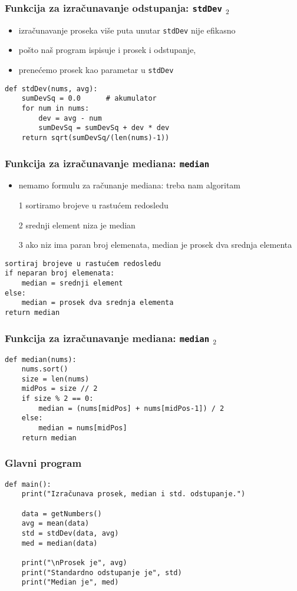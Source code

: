 \documentclass[utf8,compress]{beamer}
\begin{document}
\begin{frame}[fragile]
  \frametitle{Funkcija za izračunavanje odstupanja: \texttt{stdDev} $_2$}
  \begin{itemize}
    \item izračunavanje proseka više puta unutar \texttt{stdDev} nije efikasno
    \item pošto naš program ispisuje i prosek i odstupanje, 
    \item prenećemo prosek kao parametar u \texttt{stdDev}
  \end{itemize}
\begin{verbatim}
def stdDev(nums, avg):
    sumDevSq = 0.0      # akumulator
    for num in nums:
        dev = avg - num
        sumDevSq = sumDevSq + dev * dev
    return sqrt(sumDevSq/(len(nums)-1))
\end{verbatim}
\end{frame}

\begin{frame}[fragile]
  \frametitle{Funkcija za izračunavanje mediana: \texttt{median}}
  \begin{itemize}
    \item nemamo formulu za računanje mediana: treba nam algoritam
    \item[1] sortiramo brojeve u rastućem redosledu
    \item[2] srednji element niza je median
    \item[3] ako niz ima paran broj elemenata, median je prosek dva srednja elementa
  \end{itemize}
\begin{verbatim}
sortiraj brojeve u rastućem redosledu
if neparan broj elemenata:
    median = srednji element
else:
    median = prosek dva srednja elementa
return median
\end{verbatim}
\end{frame}

\begin{frame}[fragile]
  \frametitle{Funkcija za izračunavanje mediana: \texttt{median} $_2$}
\begin{verbatim}
def median(nums):
    nums.sort()
    size = len(nums)
    midPos = size // 2
    if size % 2 == 0:
        median = (nums[midPos] + nums[midPos-1]) / 2
    else:
        median = nums[midPos]
    return median
\end{verbatim}
\end{frame}

\begin{frame}[fragile]
  \frametitle{Glavni program}
\begin{verbatim}
def main():
    print("Izračunava prosek, median i std. odstupanje.")

    data = getNumbers()
    avg = mean(data)
    std = stdDev(data, avg)
    med = median(data)
    
    print("\nProsek je", avg)
    print("Standardno odstupanje je", std)
    print("Median je", med)
\end{verbatim}
\end{frame}
\end{document}
